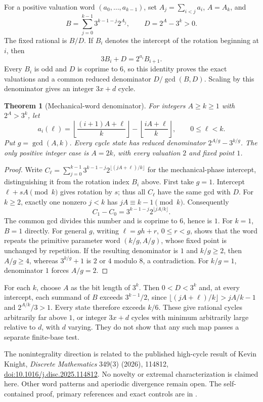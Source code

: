 \documentclass[11pt]{article}
\newtheorem{theorem}{Theorem}
\begin{document}
For a positive valuation word $(a_0,\ldots,a_{k-1})$, set
$A_j=\sum_{i<j}a_i$, $A=A_k$, and
\[
 B=\sum_{j=0}^{k-1}3^{k-1-j}2^{A_j},\qquad D=2^A-3^k>0.
\]
The fixed rational is $B/D$. If $B_i$ denotes the intercept of the
rotation beginning at $i$, then
\[
 3B_i+D=2^{a_i}B_{i+1}.
\]
Every $B_i$ is odd and $D$ is coprime to $6$, so this identity proves
the exact valuations and a common reduced denominator
$D/\gcd(B,D)$. Scaling by this denominator gives an integer $3x+d$ cycle.

\begin{theorem}[Mechanical-word denominator]
\label{thm:balanceddenominator}
For integers $A\geq k\geq1$ with $2^A>3^k$, let
\[
 a_i(\ell)=\left\lfloor\frac{(i+1)A+\ell}{k}\right\rfloor
          -\left\lfloor\frac{iA+\ell}{k}\right\rfloor,
 \qquad 0\leq\ell<k.
\]
Put $g=\gcd(A,k)$. Every cycle state has reduced denominator
$2^{A/g}-3^{k/g}$. The only positive integer case is $A=2k$,
with every valuation $2$ and fixed point $1$.
\end{theorem}
\begin{proof}
Write $C_\ell=\sum_{j=0}^{k-1}3^{k-1-j}
2^{\lfloor(jA+\ell)/k\rfloor}$ for the mechanical-phase intercept,
distinguishing it from the rotation index $B_i$ above.
First take $g=1$. Intercept $\ell+sA\pmod k$ gives rotation by $s$;
thus all $C_\ell$ have the same gcd with $D$. For $k\geq2$, exactly
one nonzero $j<k$ has $jA\equiv k-1\pmod k$. Consequently
\[
 C_1-C_0=3^{k-1-j}2^{\lfloor jA/k\rfloor}.
\]
The common gcd divides this number and is coprime to $6$, hence is $1$.
For $k=1$, $B=1$ directly. For general $g$, writing $\ell=gh+r$,
$0\leq r<g$, shows that the word repeats the primitive parameter word
$(k/g,A/g)$, whose fixed point is unchanged by repetition.
If the resulting denominator is $1$ and $k/g\geq2$, then $A/g\geq4$,
whereas $3^{k/g}+1$ is $2$ or $4$ modulo $8$, a contradiction.
For $k/g=1$, denominator $1$ forces $A/g=2$.
\end{proof}

For each $k$, choose $A$ as the bit length of $3^k$.
Then $0<D<3^k$ and, at every intercept, each summand of $B$ exceeds
$3^{k-1}/2$, since
$\lfloor(jA+\ell)/k\rfloor>jA/k-1$ and $2^{A/k}/3>1$.
Every state therefore exceeds $k/6$. These give rational cycles
arbitrarily far above $1$, or integer $3x+d$ cycles with minimum
arbitrarily large relative to $d$, with $d$ varying.
They do not show that any such map passes a separate finite-base test.

The nonintegrality direction is related to the published high-cycle
result of Kevin Knight, \emph{Discrete Mathematics} 349(3) (2026),
114812, \href{https://doi.org/10.1016/j.disc.2025.114812}{doi:10.1016/j.disc.2025.114812}.
No novelty or extremal characterization is claimed here. Other word
patterns and aperiodic divergence remain open. The self-contained proof,
primary references and exact controls are in
.
\end{document}
